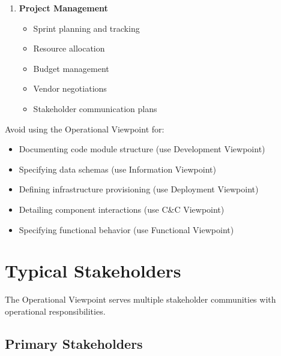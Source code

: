 \documentclass[11pt,letterpaper]{article}
\begin{document}
\begin{enumerate}[label=\textbf{AC\arabic*:}, leftmargin=2.5em]
    \item \textbf{Project Management}
    \begin{itemize}[nosep]
        \item Sprint planning and tracking
        \item Resource allocation
        \item Budget management
        \item Vendor negotiations
        \item Stakeholder communication plans
    \end{itemize}
\end{enumerate}

\begin{warningbox}
Avoid using the Operational Viewpoint for:

\begin{itemize}[nosep]
    \item Documenting code module structure (use Development Viewpoint)
    \item Specifying data schemas (use Information Viewpoint)
    \item Defining infrastructure provisioning (use Deployment Viewpoint)
    \item Detailing component interactions (use C\&C Viewpoint)
    \item Specifying functional behavior (use Functional Viewpoint)
\end{itemize}
\end{warningbox}

\section{Typical Stakeholders}

The Operational Viewpoint serves multiple stakeholder communities with operational responsibilities.

\subsection{Primary Stakeholders}
\end{document}
